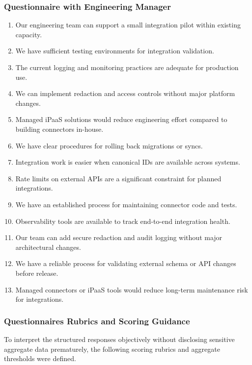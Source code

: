 \documentclass[12pt,a4paper]{report}
\begin{document}
\subsubsection{Questionnaire with Engineering Manager}
\begin{enumerate}[leftmargin=2em]
    \item Our engineering team can support a small integration pilot within existing capacity.
    \item We have sufficient testing environments for integration validation.
    \item The current logging and monitoring practices are adequate for production use.
    \item We can implement redaction and access controls without major platform changes.
    \item Managed iPaaS solutions would reduce engineering effort compared to building connectors in-house.
    \item We have clear procedures for rolling back migrations or syncs.
    \item Integration work is easier when canonical IDs are available across systems.
    \item Rate limits on external APIs are a significant constraint for planned integrations.
    \item We have an established process for maintaining connector code and tests.
    \item Observability tools are available to track end-to-end integration health.
    \item Our team can add secure redaction and audit logging without major architectural changes.
    \item We have a reliable process for validating external schema or API changes before release.
    \item Managed connectors or iPaaS tools would reduce long-term maintenance risk for integrations.
\end{enumerate}

\subsubsection{Questionnaires Rubrics and Scoring Guidance}
\label{ssub:rubrics}
To interpret the structured responses objectively without disclosing sensitive aggregate data prematurely, the following scoring rubrics and aggregate thresholds were defined.
\end{document}
